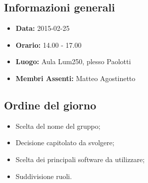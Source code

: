 \subsection{Informazioni generali}
\begin{itemize}
	\item \textbf{Data:} 2015-02-25
	\item \textbf{Orario:} 14.00 - 17.00
	\item \textbf{Luogo:} Aula Lum250, plesso Paolotti
	\item \textbf{Membri Assenti:} Matteo Agostinetto
\end{itemize}

\subsection{Ordine del giorno}
\begin{itemize}
	\item Scelta del nome del gruppo;
	\item Decisione capitolato da svolgere;
	\item Scelta dei principali software da utilizzare;
	\item Suddivisione ruoli.
\end{itemize}







